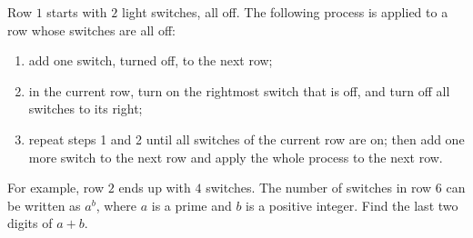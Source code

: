 Row $1$ starts with $2$ light switches, all off. The following process is applied to a row whose switches are all off:
\begin{enumerate}
\item add one switch, turned off, to the next row;
\item in the current row, turn on the rightmost switch that is off, and turn off all switches to its right;
\item repeat steps 1 and 2 until all switches of the current row are on; then add one more switch to the next row and apply the whole process to the next row.
\end{enumerate}
For example, row $2$ ends up with $4$ switches. The number of switches in row $6$ can be written as $a^b$, where $a$ is a prime and $b$ is a positive integer. Find the last two digits of $a+b$.
